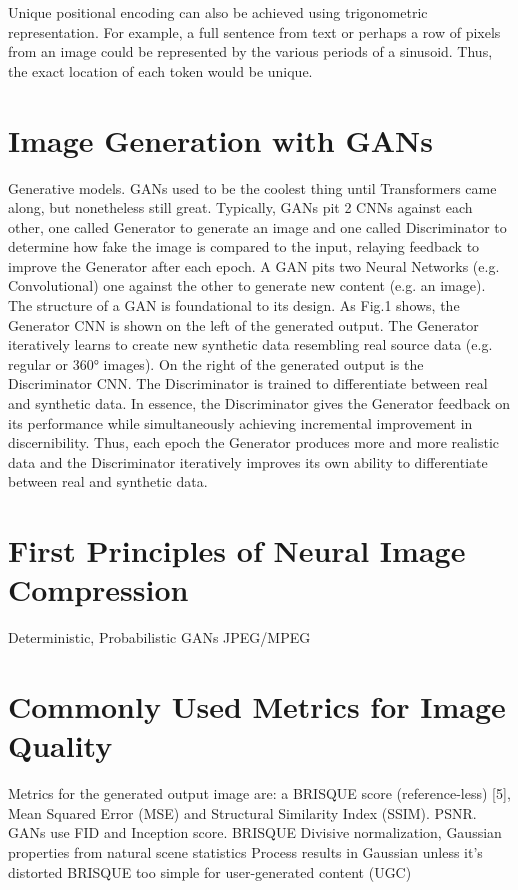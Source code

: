 Unique positional encoding can also be achieved using trigonometric representation.
For example, a full sentence from text or perhaps a row of pixels from an image could be represented by the various
periods of a sinusoid. Thus, the exact location of each token would be unique.


\section{Image Generation with GANs}

Generative models.
GANs used to be the coolest thing until Transformers came along, but nonetheless 
still great. Typically, GANs pit 2 CNNs against each other, one called Generator to 
generate an image and one called Discriminator to determine how fake the image is 
compared to the input, relaying feedback to improve the Generator after each epoch. 
A GAN pits two Neural Networks (e.g. Convolutional) one against the other to generate 
new content (e.g. an image). The structure of a GAN is foundational to its design. 
As Fig.1 shows, the Generator CNN is shown on the left of the generated output. 
The Generator iteratively learns to create new synthetic data resembling real source data 
(e.g. regular or 360° images).  On the right of the generated output is the Discriminator CNN.
The Discriminator is trained to differentiate between real and synthetic data. 
In essence, the Discriminator gives the Generator feedback on its performance while 
simultaneously achieving incremental improvement in discernibility. 
Thus, each epoch the Generator produces more and more realistic data and the Discriminator iteratively improves its own ability to differentiate between real and synthetic data.


\section{First Principles of Neural Image Compression}

Deterministic, Probabilistic
GANs
JPEG/MPEG

\section{Commonly Used Metrics for Image Quality}
Metrics for the generated output image are: a BRISQUE score (reference-less) [5], 
Mean Squared Error (MSE) and Structural Similarity Index (SSIM). PSNR.
GANs use FID and Inception score. 
BRISQUE \citep{BRISQUE}
Divisive normalization, Gaussian properties from natural scene statistics
Process results in Gaussian unless it's distorted
BRISQUE too simple for user-generated content (UGC)